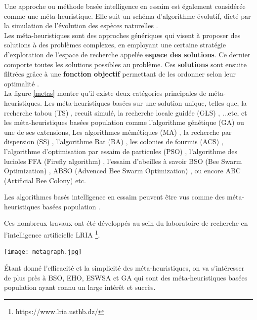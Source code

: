 Une approche ou méthode basée intelligence en essaim est également considérée comme une méta-heuristique. Elle suit un schéma d'algorithme évolutif, dicté par la simulation de l'évolution des espèces naturelles \cite{courshabiba}.
\\

Les méta-heuristiques sont des approches génériques qui visent à proposer des solutions à des problèmes complexes, en employant une certaine stratégie d'exploration de l'espace de recherche appelée \textbf{espace des solutions}. Ce dernier comporte toutes les solutions possibles au problème. Ces \textbf{solutions} sont ensuite filtrées grâce à une \textbf{fonction objectif} permettant de les ordonner selon leur optimalité \cite{courshabiba}.\\

La figure \ref{metas} montre qu’il existe deux catégories principales de méta-heuristiques. Les méta-heuristiques basées sur une solution unique, telles que, la recherche tabou (TS)  \cite{aouatTS}, recuit simulé, la recherche locale guidée (GLS) \cite{habibaGLS}, ...etc, et les méta-heuristiques basées population comme l'algorithme génétique (GA) \cite{kechidGA} ou une de ses extensions, Les algorithmes mémétiques  (MA) \cite{habibaMA}, la recherche par dispersion (SS) \cite{habibaSS-GA}, l'algorithme Bat (BA) \cite{boukraBA-ACO,habibaBA2}, les colonies de fourmis (ACS)  \cite{habibaACO}, l'algorithme d'optimisation par essaim de particules (PSO) \cite{habibaPSO}, l'algorithme des lucioles FFA (Firefly algorithm) \cite{habibaFAA}, l'essaim d'abeilles à savoir BSO (Bee Swarm Optimization) \cite{habibaBSO1,kechidBSO}, ABSO (Advenced Bee Swarm Optimization) \cite{habibaABSO}, ou encore ABC (Artificial Bee Colony) \cite{boukraABC} etc.

Les algorithmes basés intelligence en essaim peuvent être vus comme des méta-heuristiques basées population \cite{courshabiba}.

Ces nombreux travaux ont été développés au sein du laboratoire de recherche en l'intelligence artificielle LRIA \footnote{https://www.lria.usthb.dz/}.

\noindent
\begin{center}	  
	\texttt{[image: metagraph.jpg]}%
	\vspace{-0.1 cm}
	\label{metas}%
\end{center}


Étant donné l'efficacité et la simplicité des méta-heuristiques, on va s'intéresser de plus près à BSO, EHO, ESWSA et GA qui sont des méta-heuristiques basées population ayant connu un large intérêt et succès.

